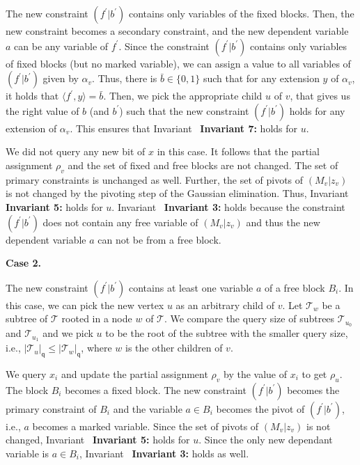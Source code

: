 \documentclass[10pt,a4paper]{article}
\begin{document}
The new constraint $(f^{\prime}|b^{\prime})$ contains only variables of the fixed blocks.
Then, the new constraint becomes a secondary constraint, and the new dependent variable $a$ can be any variable of $f^{\prime}$.
Since the constraint $(f^{\prime}|b^{\prime})$ contains only variables of fixed blocks (but no marked variable), we can assign a value to all variables of $(f^{\prime}|b^{\prime})$ given by $\alpha_{v}$.
Thus, there is $\bar{b}\in\{0,1\}$ such that for any extension $y$ of $\alpha_{v}$, it holds that $\langle f^{\prime},y\rangle=\bar{b}$.
Then, we pick the appropriate child $u$ of $v$, that gives us the right value of $b$ (and $b^{\prime}$) such that the new constraint $(f^{\prime}|b^{\prime})$ holds for any extension of $\alpha_{v}$. This ensures that Invariant \textbf{ Invariant 7:} holds for $u$.\par




We did not query any new bit of $x$ in this case.
It follows that the partial assignment $\rho_{v}$ and the set of fixed and free blocks are not changed.
The set of primary constraints is unchanged as well.
Further, the set of pivots of $(M_{v}|z_{v})$ is not changed by the pivoting step of the Gaussian elimination.
Thus, Invariant \textbf{ Invariant 5:} holds for $u$.
Invariant \textbf{ Invariant 3:} holds because the constraint $(f^{\prime}|b^{\prime})$ does not contain any free variable of $(M_{v}|z_{v})$ and thus the new dependent variable $a$ can not be from a free block.\par





\par\medskip\noindent\textbf{Case 2.}\par




The new constraint $(f^{\prime}|b^{\prime})$ contains at least one variable $a$ of a free block $B_{i}$.
In this case, we can pick the new vertex $u$ as an arbitrary child of $v$.
Let $\mathcal{T}_{w}$ be a subtree of $\mathcal{T}$ rooted in a node $w$ of $\mathcal{T}$.
We compare the query size of subtrees $\mathcal{T}_{u_{0}}$ and $\mathcal{T}_{u_{1}}$ and we pick $u$ to be the root of the subtree with the smaller query size, i.e., $|\mathcal{T}_{u}|_{\mathsf{q}}\leq|\mathcal{T}_{w}|_{\mathsf{q}}$, where $w$ is the other children of $v$.\par




We query $x_{i}$ and update the partial assignment $\rho_{v}$ by the value of $x_{i}$ to get $\rho_{u}$.
The block $B_{i}$ becomes a fixed block.
The new constraint $(f^{\prime}|b^{\prime})$ becomes the primary constraint of $B_{i}$ and the variable $a\in B_{i}$ becomes the pivot of $(f^{\prime}|b^{\prime})$, i.e., $a$ becomes a marked variable.
Since the set of pivots of $(M_{v}|z_{v})$ is not changed, Invariant \textbf{ Invariant 5:} holds for $u$.
Since the only new dependant variable is $a\in B_{i}$, Invariant \textbf{ Invariant 3:} holds as well.\par
\end{document}
